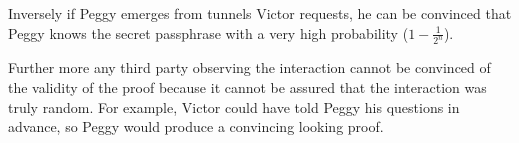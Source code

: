 Inversely if Peggy emerges from tunnels Victor requests, he can be convinced that Peggy knows the secret passphrase with a very high probability ($1 - \frac{1}{2^n}$).

\bigskip

Further more any third party observing the interaction cannot be convinced of the validity of the proof because it cannot be assured that the interaction was truly random. For example, Victor could have told Peggy his questions in advance, so Peggy would produce a convincing looking proof.

